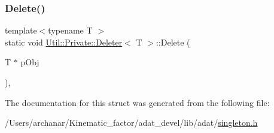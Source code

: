 \mbox{\label{structUtil_1_1Private_1_1Deleter_adcc10f3684fbff2ca9a16827f30994b4}} 
\subsubsection{\texorpdfstring{Delete()}{Delete()}\hspace{0.1cm}{\footnotesize\ttfamily [2/2]}}
{\footnotesize\ttfamily template$<$typename T $>$ \\
static void \mbox{\hyperlink{structUtil_1_1Private_1_1Deleter}{Util\+::\+Private\+::\+Deleter}}$<$ T $>$\+::Delete (\begin{DoxyParamCaption}\item[{T $\ast$}]{p\+Obj }\end{DoxyParamCaption})\hspace{0.3cm}{\ttfamily [inline]}, {\ttfamily [static]}}



The documentation for this struct was generated from the following file\+:\begin{DoxyCompactItemize}
\item 
/\+Users/archanar/\+Kinematic\+\_\+factor/adat\+\_\+devel/lib/adat/\mbox{\hyperlink{lib_2adat_2singleton_8h}{singleton.\+h}}\end{DoxyCompactItemize}

